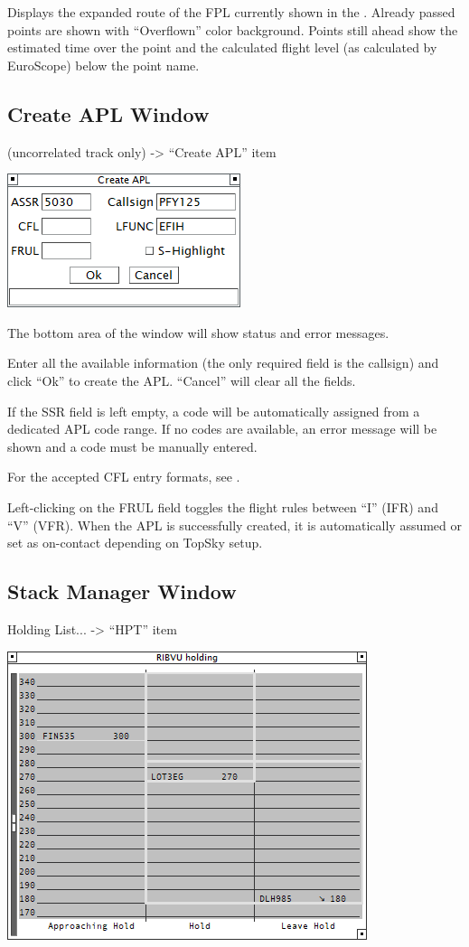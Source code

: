 \documentclass[11pt,a4paper,oldfontcommands]{memoir}
\begin{document}
Displays the expanded route of the FPL currently shown in the \textit{}. Already passed points are shown with “Overflown” color background. Points still ahead show the estimated time over the point and the calculated flight level (as calculated by EuroScope) below the point name.

\subsection{Create APL Window}
\label{win:apl}

\textit{} (uncorrelated track only) -> “Create APL” item

\includegraphics{img/apl2.png}

The bottom area of the window will show status and error messages.

Enter all the available information (the only required field is the callsign) and click “Ok” to create the APL. “Cancel” will clear all the fields.

If the SSR field is left empty, a code will be automatically assigned from a dedicated APL code range. If no codes are available, an error message will be shown and a code must be manually entered.

For the accepted CFL entry formats, see \textit{}.

Left-clicking on the FRUL field toggles the flight rules between “I” (IFR) and “V” (VFR).
When the APL is successfully created, it is automatically assumed or set as on-contact depending on TopSky setup.

\subsection{Stack Manager Window}
\label{win:smw}
Holding List... -> “HPT” item

\includegraphics{img/stackman.png}
\end{document}
